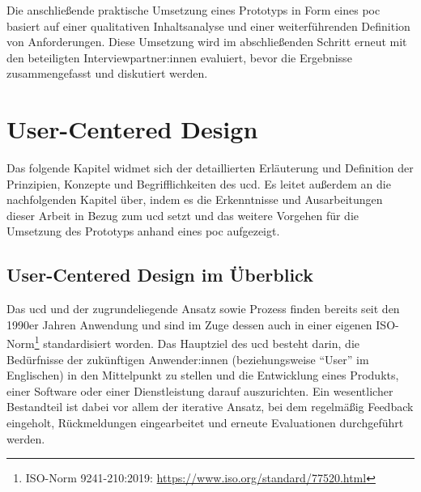 \documentclass[a4paper,12pt,twoside]{scrreprt}
\begin{document}
Die anschließende praktische Umsetzung eines Prototyps in Form eines \acl{poc} basiert auf einer qualitativen Inhaltsanalyse und einer weiterführenden Definition von Anforderungen. Diese Umsetzung wird im abschließenden Schritt erneut mit den beteiligten Interviewpartner:innen evaluiert, bevor die Ergebnisse zusammengefasst und diskutiert werden.

\cleardoublepage
\chapter{User-Centered Design}
\label{chap:user-centered-design}

Das folgende Kapitel widmet sich der detaillierten Erläuterung und Definition der Prinzipien, Konzepte und Begrifflichkeiten des \ac{ucd}. Es leitet außerdem an die nachfolgenden Kapitel über, indem es die Erkenntnisse und Ausarbeitungen dieser Arbeit in Bezug zum \acl{ucd} setzt und das weitere Vorgehen für die Umsetzung des Prototyps anhand eines \ac{poc} aufgezeigt.

\section{User-Centered Design im Überblick}
\label{sec:überblick-ucd}

Das \ac{ucd} und der zugrundeliegende Ansatz sowie Prozess finden bereits seit den 1990er Jahren Anwendung und sind im Zuge dessen auch in einer eigenen ISO-Norm\footnote{ISO-Norm 9241-210:2019: \url{https://www.iso.org/standard/77520.html}} standardisiert worden. Das Hauptziel des \ac{ucd} besteht darin, die Bedürfnisse der zukünftigen Anwender:innen (beziehungsweise \enquote{User} im Englischen) in den Mittelpunkt zu stellen und die Entwicklung eines Produkts, einer Software oder einer Dienstleistung darauf auszurichten. Ein wesentlicher Bestandteil ist dabei vor allem der iterative Ansatz, bei dem regelmäßig Feedback eingeholt, Rückmeldungen eingearbeitet und erneute Evaluationen durchgeführt werden. \cite{frieling_user_2019}

\medskip
\end{document}
